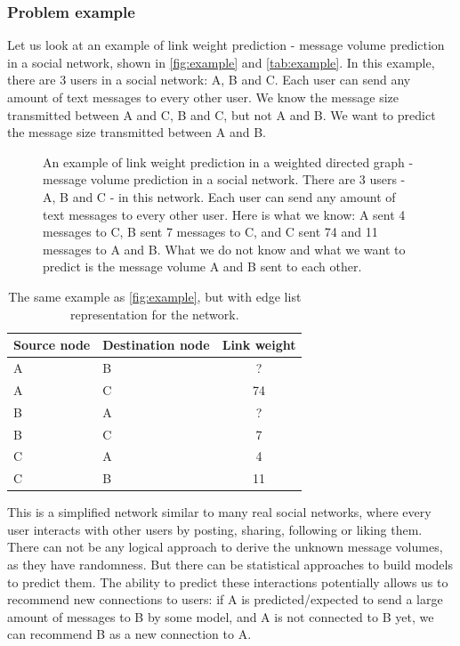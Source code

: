 \documentclass{article}
\begin{document}
\subsubsection{Problem example}
Let us look at an example of link weight prediction - message volume prediction in a social network, shown in \autoref{fig:example} and \autoref{tab:example}.
In this example, there are 3 users in a social network: A, B and C.
Each user can send any amount of text messages to every other user.
We know the message size transmitted between A and C, B and C, but not A and B.
We want to predict the message size transmitted between A and B.
\begin{figure}[!htb]\centering
	\caption{
		An example of link weight prediction in a weighted directed graph -
		message volume prediction in a social network.
		There are 3 users - A, B and C - in this network.
		Each user can send any amount of text messages to every other user.
		Here is what we know:
		A sent 4 messages to C,
		B sent 7 messages to C,
		and C sent 74 and 11 messages to A and B.
		What we do not know and what we want to predict is
		the message volume A and B sent to each other.
		}
	\label{fig:example}
\end{figure}
\begin{table}[!htb]\centering
	\caption{
		The same example as \autoref{fig:example}, but with edge list representation for the network.
	}
	\begin{tabularx}{0.6\textwidth}{|X|X|c|}  \hline \rowcolor{blue!40}
		Source node & Destination node & Link weight \\ \hline
		A & B & ? \\ \hline
		A & C & 74 \\ \hline
		B & A & ? \\ \hline
		B & C & 7 \\ \hline
		C & A & 4 \\ \hline
		C & B & 11 \\ \hline
	\end{tabularx}
	\label{tab:example}
\end{table}
This is a simplified network similar to many real social networks, where every user interacts with other users by posting, sharing, following or liking them.
There can not be any logical approach to derive the unknown message volumes,
as they have randomness.
But there can be statistical approaches to build models to predict them.
The ability to predict these interactions potentially allows us to recommend new connections to users:
if A is predicted/expected to send a large amount of messages to B by some model,
and A is not connected to B yet,
we can recommend B as a new connection to A.
\end{document}
